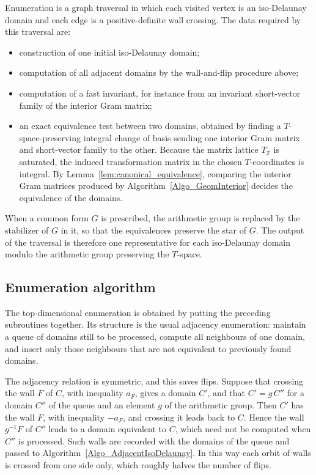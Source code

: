 \documentclass{amsart}
\newcommand{\ZZ}{\mathbb{Z}}
\begin{document}
Enumeration is a graph traversal in which each visited vertex is an
iso-Delaunay domain and each edge is a positive-definite wall crossing.  The
data required by this traversal are:
\begin{itemize}[leftmargin=2em]
  \item construction of one initial iso-Delaunay domain;
  \item computation of all adjacent domains by the wall-and-flip procedure
        above;
  \item computation of a fast invariant, for instance from an invariant
        short-vector family of the interior Gram matrix;
  \item an exact equivalence test between two domains, obtained by finding a
        \(T\)-space-preserving integral change of basis sending one interior
        Gram matrix and short-vector family to the other.  Because the matrix
        lattice \(T_{\ZZ}\) is saturated, the induced transformation matrix
        in the chosen \(T\)-coordinates is integral.  By
        Lemma~\ref{lem:canonical_equivalence}, comparing the interior Gram
        matrices produced by Algorithm~\ref{Algo_GeomInterior} decides the
        equivalence of the domains.
\end{itemize}
When a common form \(G\) is prescribed, the arithmetic group is replaced by
the stabilizer of \(G\) in it, so that the equivalences preserve the star of
\(G\).
The output of the traversal is therefore one representative for each
iso-Delaunay domain modulo the arithmetic group preserving the \(T\)-space.

\subsection{Enumeration algorithm}

The top-dimensional enumeration is obtained by putting the preceding
subroutines together.  Its structure is the usual adjacency enumeration:
maintain a queue of domains still to be processed, compute all neighbours of
one domain, and insert only those neighbours that are not equivalent to
previously found domains.

The adjacency relation is symmetric, and this saves flips.  Suppose that
crossing the wall \(F\) of \(C\), with inequality \(a_F\), gives a domain
\(C'\), and that \(C'=g\,C''\) for a domain \(C''\) of the queue and an
element \(g\) of the arithmetic group.  Then \(C'\) has the wall \(F\), with
inequality \(-a_F\), and crossing it leads back to \(C\).  Hence the wall
\(g^{-1}F\) of \(C''\) leads to a domain equivalent to \(C\), which need not
be computed when \(C''\) is processed.  Such walls are recorded with the
domains of the queue and passed to Algorithm~\ref{Algo_AdjacentIsoDelaunay}.
In this way each orbit of walls is crossed from one side only, which roughly
halves the number of flips.
\end{document}
